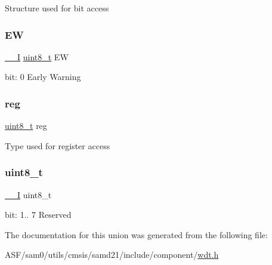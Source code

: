 Structure used for bit access \mbox{\label{union_w_d_t___i_n_t_f_l_a_g___type_af3cb0564a7de6739c82f0210c4ccb15b}} 
\subsubsection{\texorpdfstring{EW}{EW}}
{\footnotesize\ttfamily \mbox{\hyperlink{core__cm0plus_8h_af63697ed9952cc71e1225efe205f6cd3}{\+\_\+\+\_\+I}} \mbox{\hyperlink{union_w_d_t___i_n_t_f_l_a_g___type_a5b4208c6f4c4a4290c4f2804d1eb1d5b}{uint8\+\_\+t}} EW}

bit\+: 0 Early Warning \mbox{\label{union_w_d_t___i_n_t_f_l_a_g___type_a9428adc9af4653a2050e2536b55dec8d}} 
\subsubsection{\texorpdfstring{reg}{reg}}
{\footnotesize\ttfamily \mbox{\hyperlink{union_w_d_t___i_n_t_f_l_a_g___type_a5b4208c6f4c4a4290c4f2804d1eb1d5b}{uint8\+\_\+t}} reg}

Type used for register access \mbox{\label{union_w_d_t___i_n_t_f_l_a_g___type_a5b4208c6f4c4a4290c4f2804d1eb1d5b}} 
\subsubsection{\texorpdfstring{uint8\_t}{uint8\_t}}
{\footnotesize\ttfamily \mbox{\hyperlink{core__cm0plus_8h_af63697ed9952cc71e1225efe205f6cd3}{\+\_\+\+\_\+I}} uint8\+\_\+t}

bit\+: 1.. 7 Reserved 

The documentation for this union was generated from the following file\+:\begin{DoxyCompactItemize}
\item 
A\+S\+F/sam0/utils/cmsis/samd21/include/component/\mbox{\hyperlink{component_2wdt_8h}{wdt.\+h}}\end{DoxyCompactItemize}
